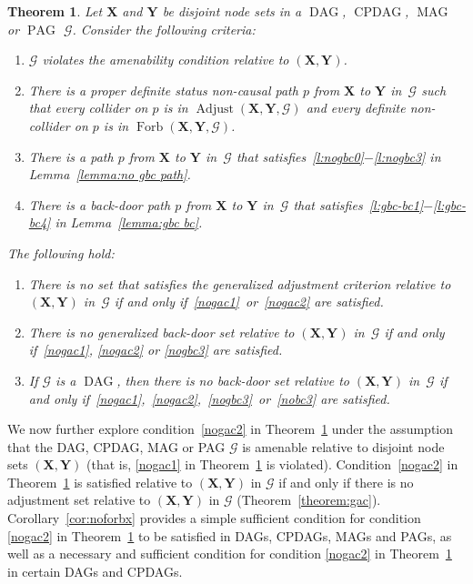 \documentclass[11pt,a4paper]{article}
\newtheorem{theorem}[definition]{Theorem}
\DeclareMathOperator{\CPDAG}{CPDAG}
\DeclareMathOperator{\DAG}{DAG}
\DeclareMathOperator{\MAG}{MAG}
\DeclareMathOperator{\PAG}{PAG}
\DeclareMathOperator{\Adjust}{Adjust}
\DeclareMathOperator{\Forbi}{Forb}
\newcommand{\amen}{the amenability condition\xspace}
\newcommand{\g}[1][G]{\mathcal{#1}}
\newcommand{\adjustb}[2][X,Y]{\Adjust(\mathbf{#1},#2)}
\newcommand{\fb}[2][X,Y]{\Forbi(\mathbf{#1},#2)}%
\begin{document}
\begin{theorem}
Let $\mathbf{X}$ and $\mathbf{Y}$ be disjoint node sets in a $\DAG$, $\CPDAG$, $\MAG$ or $\PAG$ $\g$.
Consider the following criteria:
\begin{enumerate}[label=(\arabic*)]
\item\label{nogac1} $\g$ violates \amen{} relative to $(\mathbf{X,Y})$.
\item\label{nogac2} There is a proper definite status non-causal path $p$ from $\mathbf{X}$ to $\mathbf{Y}$ in~$\g$ such that every collider on $p$ is in $\adjustb{\g}$ and every definite non-collider on $p$ is in $\fb{\g}$.
\item\label{nogbc3} There is a path $p$ from $\mathbf{X}$ to $\mathbf{Y}$ in~$\g$ that satisfies~\ref{l:nogbc0}$-$\ref{l:nogbc3} in Lemma~\ref{lemma:no gbc path}.
\item\label{nobc3} There is a back-door path $p$ from $\mathbf{X}$ to $\mathbf{Y}$ in~$\g$ that satisfies~\ref{l:gbc-bc1}$-$\ref{l:gbc-bc4} in Lemma~\ref{lemma:gbc bc}.
\end{enumerate}
The following hold:
\begin{enumerate}[label=(\roman*)]
\item\label{nogac} There is no set that satisfies the generalized adjustment criterion relative to $(\mathbf{X,Y})$ in~$\g$ if and only if~\ref{nogac1}~or~\ref{nogac2} are satisfied.
\item\label{nogbc} There is no generalized back-door set relative to $(\mathbf{X,Y})$ in~$\g$ if and only if~\ref{nogac1}, \ref{nogac2} or \ref{nogbc3} are satisfied.
\item\label{nobc} If $\g$ is a $\DAG$, then there is no back-door set relative to $(\mathbf{X,Y})$ in~$\g$ if and only if~\ref{nogac1},~\ref{nogac2},~\ref{nogbc3}~or~\ref{nobc3} are satisfied.
\end{enumerate}
\label{theorem:unified-nope}
\end{theorem}

We now further explore condition~\ref{nogac2} in Theorem~\ref{theorem:unified-nope} under the assumption that the DAG, CPDAG, MAG or PAG $\g$ is amenable relative to disjoint node sets $(\mathbf{X,Y})$ (that is, \ref{nogac1} in Theorem~\ref{theorem:unified-nope} is violated). Condition~\ref{nogac2} in Theorem~\ref{theorem:unified-nope} is satisfied relative to $\mathbf{(X,Y)}$ in $\g$ if and only if there is no adjustment set relative to $(\mathbf{X,Y})$ in $\g$ (Theorem~\ref{theorem:gac}). Corollary~\ref{cor:noforbx} provides a simple sufficient condition for condition \ref{nogac2} in Theorem~\ref{theorem:unified-nope} to be satisfied in DAGs, CPDAGs, MAGs and PAGs, as well as a necessary and sufficient condition for condition \ref{nogac2} in Theorem~\ref{theorem:unified-nope} in certain DAGs and CPDAGs. 
\end{document}
